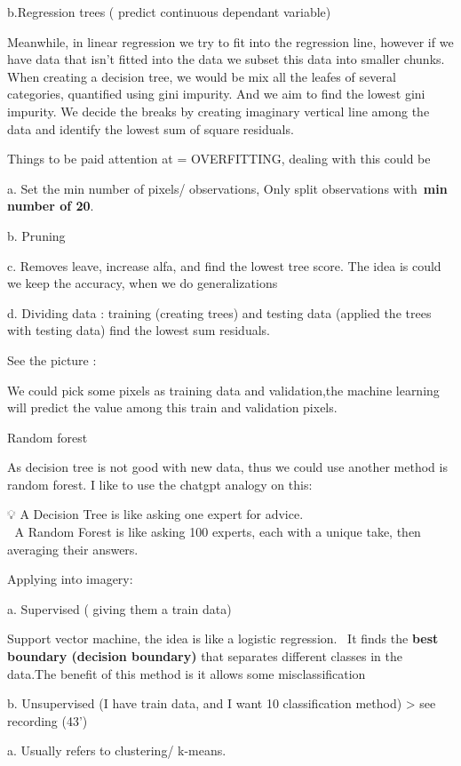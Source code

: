 \documentclass[
  letterpaper,
  DIV=11,
  numbers=noendperiod]{scrreprt}
\begin{document}
b.Regression trees ( predict continuous dependant variable)

Meanwhile, in linear regression we try to fit into the regression line,
however if we have data that isn't fitted into the data we subset this
data into smaller chunks. When creating a decision tree, we would be mix
all the leafes of several categories, quantified using gini impurity.
And we aim to find the lowest gini impurity. We decide the breaks by
creating imaginary vertical line among the data and identify the lowest
sum of square residuals.

Things to be paid attention at = OVERFITTING, dealing with this could be

a. Set the min number of pixels/ observations, Only split observations
with~\textbf{min number of 20}.

b. Pruning

c. Removes leave, increase alfa, and find the lowest tree score. The
idea is could we keep the accuracy, when we do generalizations

d. Dividing data : training (creating trees) and testing data (applied
the trees with testing data) find the lowest sum residuals.

See the picture :

We could pick some pixels as training data and validation,the machine
learning will predict the value among this train and validation pixels.

Random forest

As decision tree is not good with new data, thus we could use another
method is random forest. I like to use the chatgpt analogy on this:

💡 A Decision Tree is like asking one expert for advice.\\
🌲 A Random Forest is like asking 100 experts, each with a unique take,
then averaging their answers.

Applying into imagery:

a. Supervised ( giving them a train data)

Support vector machine, the idea is like a logistic regression. ~It
finds the \textbf{best boundary (decision boundary)} that separates
different classes in the data.The benefit of this method is it allows
some misclassification

b. Unsupervised (I have train data, and I want 10 classification method)
\textgreater{} see recording (43')

a. Usually refers to clustering/ k-means.
\end{document}
